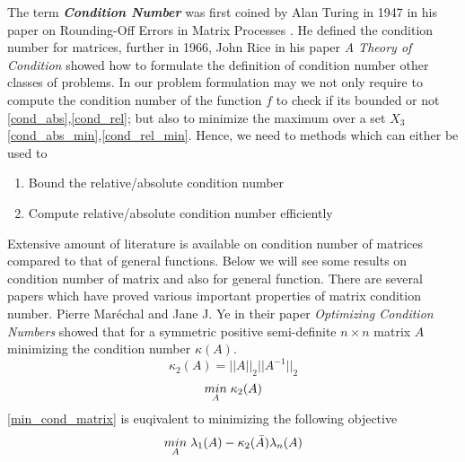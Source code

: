 \newpage
{}
The term \textbf{\textit{Condition Number}} was first coined by Alan Turing in 1947 in his paper on Rounding-Off Errors in Matrix Processes \cite{turing1948rounding}. He defined the condition number for matrices, further in 1966, John Rice in his paper \textit{A Theory of Condition} \cite{rice1966theory} showed how to formulate the definition of condition number other classes of problems.
\newline\newline In our problem formulation may we not only require to compute the condition number of the function $f$ to check if its bounded or not \ref{cond_abs},\ref{cond_rel}; but also to minimize the maximum over a set $X_3$ \ref{cond_abs_min},\ref{cond_rel_min}.
\newline\newline Hence, we need to methods which can either be used to 
\begin{enumerate}
    \item Bound the relative/absolute condition number
    \item Compute relative/absolute condition number efficiently
\end{enumerate}
Extensive amount of literature is available on condition number of matrices compared to that of general functions. Below we will see some results on condition number of matrix and also for general function.
There are several papers which have proved various important properties of matrix condition number. Pierre Maréchal and Jane J. Ye in their paper \textit{Optimizing Condition Numbers}\cite{marechal2009optimizing} showed that for a symmetric positive semi-definite $n\times n$ matrix $A$ minimizing the condition number $\kappa (A)$.
\begin{equation} \label{cond_matrix}
    \kappa_2 (A) = ||A||_2||A^{-1}||_2
\end{equation}
\begin{equation} \label{min_cond_matrix}
    \underset{A}{min}\hspace{1mm} \kappa_2 (A)
\end{equation}
\ref{min_cond_matrix} is euqivalent to minimizing the following objective
\begin{equation}
    \underset{A}{min}\hspace{1mm} \lambda_1(A) - \kappa_2 (\Bar{A}) \lambda_n(A)
\end{equation}
